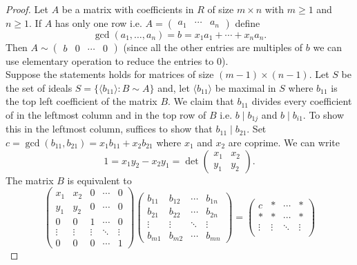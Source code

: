 \documentclass[12pt, a4paper]{article}
\begin{document}
\begin{proof}
    Let \(A\) be a matrix with coefficients in \(R\) of size \(m\times n\) with \(m\geq 1\) and \(n\geq 1\). If \(A\) has only one row i.e. \(A = \begin{pmatrix} a_1 & \cdots &a_n \end{pmatrix}\) define 
    \[\gcd(a_1,\ldots,a_n)=b=x_1a_1+\cdots+x_na_n.\]
    Then \(A \sim \begin{pmatrix} b & 0 & \cdots &0 \end{pmatrix}\) (since all the other entries are multiples of \(b\) we can use elementary operation to reduce the entries to \(0\)).\\
    Suppose the statements holds for matrices of size \((m-1)\times(n-1)\). Let \(S\) be the set of ideals \(S = \{\langle b_{11} \rangle :B\sim A\}\) and, let \(\langle b_{11} \rangle\) be maximal in \(S\) where \(b_{11}\) is the top left coefficient of the matrix \(B\). We claim that \(b_{11}\) divides every coefficient of in the leftmost column and in the top row of \(B\) i.e. \(b \mid b_{1j}\) and \(b\mid b_{i1}\). To show this in the leftmost column, suffices to show that \(b_{11}\mid b_{21}\). Set \(c = \gcd(b_{11},b_{21}) = x_1 b_{11}+x_2b_{21}\) where \(x_1\) and \(x_2\) are coprime. We can write 
    \[1= x_1y_2-x_2y_1 = \det\begin{pmatrix}x_1 &x_2 \\y_1 &y_2 \end{pmatrix}.\]
    The matrix \( B \) is equivalent to
\[
\begin{pmatrix}
x_1 & x_2 & 0 & \cdots & 0 \\
y_1 & y_2 & 0 & \cdots & 0 \\
0 & 0 & 1 & \cdots & 0 \\
\vdots & \vdots & \vdots & \ddots & \vdots \\
0 & 0 & 0 & \cdots & 1
\end{pmatrix}
\begin{pmatrix}
b_{11} & b_{12} & \cdots & b_{1n} \\
b_{21} & b_{22} & \cdots & b_{2n} \\
\vdots & \vdots & \ddots & \vdots \\
b_{m1} & b_{m2} & \cdots & b_{mn}
\end{pmatrix}
=
\begin{pmatrix}
c & * & \cdots & * \\
* & * & \cdots & * \\
\vdots & \vdots & \ddots & \vdots \\

\end{pmatrix}\]
\end{proof}
\end{document}
